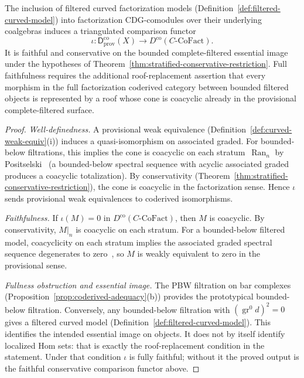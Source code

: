 \begin{proposition}
\label{prop:provisional-embedding}
The inclusion of filtered curved factorization models
\textup{(}Definition~\textup{\ref{def:filtered-curved-model})}
into factorization CDG-comodules over their underlying coalgebras
induces a triangulated comparison functor
\[
\iota \colon
\mathsf{D}^{\mathrm{co}}_{\mathrm{prov}}(X)
\longrightarrow
D^{\mathrm{co}}(C\text{-}\mathrm{CoFact}).
\]
It is faithful and conservative on the bounded complete-filtered
essential image under the hypotheses of
Theorem~\ref{thm:stratified-conservative-restriction}. Full
faithfulness requires the additional roof-replacement assertion that
every morphism in the full factorization coderived category between
bounded filtered objects is represented by a roof whose cone is
coacyclic already in the provisional complete-filtered surface.
\end{proposition}

\begin{proof}
\emph{Well-definedness.}
A provisional weak equivalence
(Definition~\ref{def:curved-weak-equiv}(i)) induces a
quasi-isomorphism on associated graded. For bounded-below
filtrations, this implies the cone is coacyclic on each
stratum~$\operatorname{Ran}_n$ by
Positselski~\cite[Proposition~3.5]{Positselski11} (a
bounded-below spectral sequence with acyclic associated graded
produces a coacyclic totalization). By conservativity
(Theorem~\ref{thm:stratified-conservative-restriction}), the cone
is coacyclic in the factorization sense. Hence $\iota$
sends provisional weak equivalences to coderived isomorphisms.

\emph{Faithfulness.}
If $\iota(M) = 0$ in $D^{\mathrm{co}}(C\text{-}\mathrm{CoFact})$,
then $M$ is coacyclic. By conservativity, $M|_n$ is coacyclic
on each stratum. For a bounded-below filtered model, coacyclicity
on each stratum implies the associated graded spectral sequence
degenerates to zero~\cite[Proposition~3.5]{Positselski11}, so
$M$ is weakly equivalent to zero in the provisional sense.

\emph{Fullness obstruction and essential image.}
The PBW filtration on bar complexes
(Proposition~\ref{prop:coderived-adequacy}(b)) provides the
prototypical bounded-below filtration. Conversely, any
bounded-below filtration with
$(\operatorname{gr}^0 d)^2 = 0$ gives a filtered curved model
(Definition~\ref{def:filtered-curved-model}).
This identifies the intended essential image on objects. It does not
by itself identify localized Hom sets: that is exactly the
roof-replacement condition in the statement. Under that condition
$\iota$ is fully faithful; without it the proved output is the
faithful conservative comparison functor above.
\end{proof}

